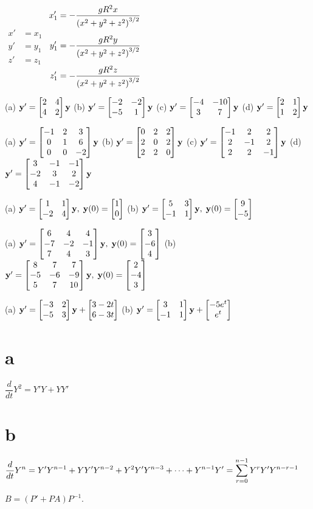 $\begin{aligned} x'&=x_1\\y'&=y_1\\z'&=z_1\end{aligned}$
\qquad\qquad$\dst{
\begin{aligned}
 x_1'&=-\dfrac{gR^2x}{\left(x^2+y^2+z^2\right)^{3/2}}\\\addlinespace
 y_1'&=-\dfrac{gR^2y}{\left(x^2+y^2+z^2\right)^{3/2}}\\\addlinespace
 z_1'&=-\dfrac{gR^2z}{\left(x^2+y^2+z^2\right)^{3/2}}
\end{aligned}}$


(a) $\mathbf{y}'=\begin{bmatrix}2&4\\4&2\end{bmatrix}\mathbf{y}$\;
\qquad
(b) $\mathbf{y}'=\begin{bmatrix}-2&-2\\-5&1\end{bmatrix}\mathbf{y}$
(c) $\mathbf{y}'=\begin{bmatrix}-4&-10\\3&7\end{bmatrix}\mathbf{y}$\;
(d) $\mathbf{y}'=\begin{bmatrix}2&1\\1&2\end{bmatrix}\mathbf{y}$

(a) $\mathbf{y}'=\begin{bmatrix}-1&2&3\\0&1&6\\0&0&-2\end{bmatrix}\mathbf{y}$
\quad
(b) $\mathbf{y}'=\begin{bmatrix}0&2&2\\2&0&2\\2&2&0\end{bmatrix}\mathbf{y}$
(c) $\mathbf{y}'=\begin{bmatrix}-1&2&2\\2&-1&2\\2&2&-1\end{bmatrix}\mathbf{y}$
\quad
(d)
$\mathbf{y}'=\begin{bmatrix}3&-1&-1\\-2&3&2\\4&-1&-2\end{bmatrix}\mathbf{y}$

(a) $\mathbf{y}'=\begin{bmatrix}1&1\\-2&4\end{bmatrix}\mathbf{y},\; \mathbf{y}(0)=\begin{bmatrix}1\\0\end{bmatrix}$
\quad
(b) $\mathbf{y}'=\begin{bmatrix}5&3\\-1&1\end{bmatrix}\mathbf{y},\; \mathbf{y}(0)=\begin{bmatrix}9\\-5\end{bmatrix}$

(a) $\mathbf{y}'=\begin{bmatrix}6&4&4\\-7&-2&-1\\7&4&3\end{bmatrix}\mathbf{y},\; \mathbf{y}(0)
=\begin{bmatrix}3\\-6\\4\end{bmatrix}$
(b) $\mathbf{y}'=\begin{bmatrix}8&7&7\\-5&-6&-9\\5&7&10\end{bmatrix}\mathbf{y},\; \mathbf{y}(0) =\begin{bmatrix}2\\-4\\3\end{bmatrix}$

(a) $\mathbf{y}'=\begin{bmatrix}-3&2\\-5&3\end{bmatrix}\mathbf{y}+\begin{bmatrix}3-2t\\6-3t\end{bmatrix}$
\quad
(b) $\mathbf{y}'=\begin{bmatrix}3&1\\-1&1\end{bmatrix}\mathbf{y}
+\begin{bmatrix}-5e^t\\e^t\end{bmatrix}$

\part{a}\;  $\dfrac{d}{dt}Y^2=Y'Y+YY'$
\part{b}\;
$\displaystyle\frac{d}{dt}Y^{n}=
Y'Y^{n-1}+Y Y'Y^{n-2}+Y^2Y'Y^{n-3}+\cdots+Y^{n-1}Y'=
\sum_{r=0}^{n-1}
Y^r Y'Y^{n-r-1}$

$B=(P'+PA)P^{-1}$.

